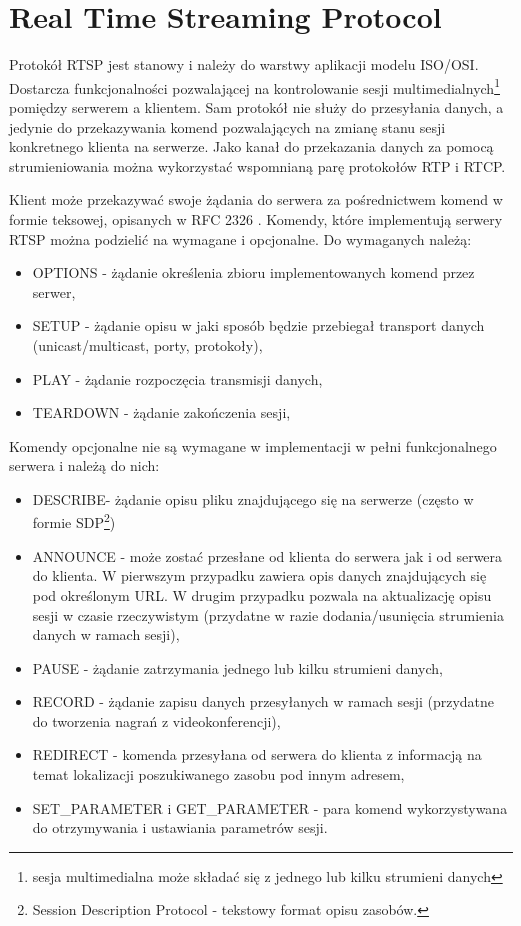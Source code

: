 \section{Real Time Streaming Protocol}

Protokół RTSP jest stanowy i należy do warstwy aplikacji modelu ISO/OSI. Dostarcza funkcjonalności pozwalającej na kontrolowanie sesji multimedialnych\footnote{sesja multimedialna może składać się z jednego lub kilku strumieni danych} pomiędzy serwerem a klientem. Sam protokół nie służy do przesyłania danych, a jedynie do przekazywania komend pozwalających na zmianę stanu sesji konkretnego klienta na serwerze. Jako kanał do przekazania danych za pomocą strumieniowania można wykorzystać wspomnianą parę protokołów RTP i RTCP. 

Klient może przekazywać swoje żądania do serwera za pośrednictwem komend w formie teksowej, opisanych w RFC 2326 \cite{RFC2326}. Komendy, które implementują serwery RTSP można podzielić na wymagane i opcjonalne. Do wymaganych należą:
\begin{itemize}
\item OPTIONS - żądanie określenia zbioru implementowanych komend przez serwer,
\item SETUP - żądanie opisu w jaki sposób będzie przebiegał transport danych (unicast/multicast, porty, protokoły),
\item PLAY - żądanie rozpoczęcia transmisji danych,
\item TEARDOWN - żądanie zakończenia sesji,
\end{itemize}
Komendy opcjonalne nie są wymagane w implementacji w pełni funkcjonalnego serwera i należą do nich:
\begin{itemize}
\item DESCRIBE- żądanie opisu pliku znajdującego się na serwerze (często w formie SDP\footnote{Session Description Protocol - tekstowy format opisu zasobów.})
\item ANNOUNCE - może zostać przesłane od klienta do serwera jak i od serwera do klienta. W pierwszym przypadku zawiera opis danych znajdujących się pod określonym URL. W drugim przypadku pozwala na aktualizację opisu sesji w czasie rzeczywistym (przydatne w razie dodania/usunięcia strumienia danych w ramach sesji),
\item PAUSE - żądanie zatrzymania jednego lub kilku strumieni danych,
\item RECORD - żądanie zapisu danych przesyłanych w ramach sesji (przydatne do tworzenia nagrań z videokonferencji),
\item REDIRECT - komenda przesyłana od serwera do klienta z informacją na temat lokalizacji poszukiwanego zasobu pod innym adresem,
\item SET\_PARAMETER i GET\_PARAMETER - para komend wykorzystywana do otrzymywania i ustawiania parametrów sesji.
\end{itemize}

